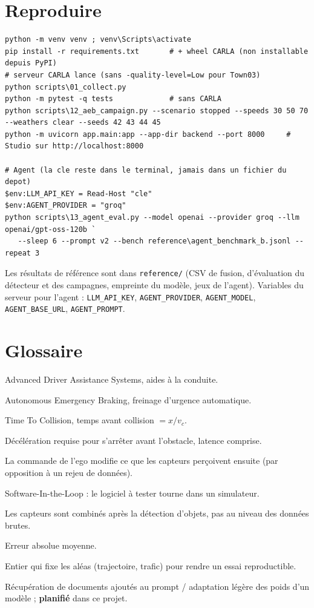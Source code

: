\documentclass[11pt,a4paper]{article}
\newcommand{\plan}{\textcolor{badc}{\textbf{planifi\'e}}}
\newcommand{\code}[1]{\texttt{#1}}
\begin{document}
\section{Reproduire}
\begin{lstlisting}
python -m venv venv ; venv\Scripts\activate
pip install -r requirements.txt       # + wheel CARLA (non installable depuis PyPI)
# serveur CARLA lance (sans -quality-level=Low pour Town03)
python scripts\01_collect.py
python -m pytest -q tests             # sans CARLA
python scripts\12_aeb_campaign.py --scenario stopped --speeds 30 50 70 --weathers clear --seeds 42 43 44 45
python -m uvicorn app.main:app --app-dir backend --port 8000     # Studio sur http://localhost:8000

# Agent (la cle reste dans le terminal, jamais dans un fichier du depot)
$env:LLM_API_KEY = Read-Host "cle"
$env:AGENT_PROVIDER = "groq"
python scripts\13_agent_eval.py --model openai --provider groq --llm openai/gpt-oss-120b `
   --sleep 6 --prompt v2 --bench reference\agent_benchmark_b.jsonl --repeat 3
\end{lstlisting}
Les r\'esultats de r\'ef\'erence sont dans \code{reference/} (CSV de fusion, d'\'evaluation du d\'etecteur et des campagnes, empreinte du mod\`ele, jeux de l'agent). Variables du serveur pour l'agent :
\code{LLM\_API\_KEY}, \code{AGENT\_PROVIDER}, \code{AGENT\_MODEL}, \code{AGENT\_BASE\_URL}, \code{AGENT\_PROMPT}.

\section{Glossaire}
\begin{description}[leftmargin=3cm,labelwidth=2.8cm,style=nextline]
\item[ADAS] Advanced Driver Assistance Systems, aides \`a la conduite.
\item[AEB] Autonomous Emergency Braking, freinage d'urgence automatique.
\item[TTC] Time To Collision, temps avant collision $=x/v_c$.
\item[$a_{req}$] D\'ec\'el\'eration requise pour s'arr\^eter avant l'obstacle, latence comprise.
\item[Boucle ferm\'ee] La commande de l'ego modifie ce que les capteurs per\c coivent ensuite (par opposition \`a un rejeu de donn\'ees).
\item[SIL] Software-In-the-Loop : le logiciel \`a tester tourne dans un simulateur.
\item[Fusion tardive] Les capteurs sont combin\'es apr\`es la d\'etection d'objets, pas au niveau des donn\'ees brutes.
\item[MAE] Erreur absolue moyenne.
\item[Graine] Entier qui fixe les al\'eas (trajectoire, trafic) pour rendre un essai reproductible.
\item[RAG / LoRA] R\'ecup\'eration de documents ajout\'es au prompt / adaptation l\'eg\`ere des poids d'un mod\`ele ; \plan{} dans ce projet.
\end{description}
\end{document}

